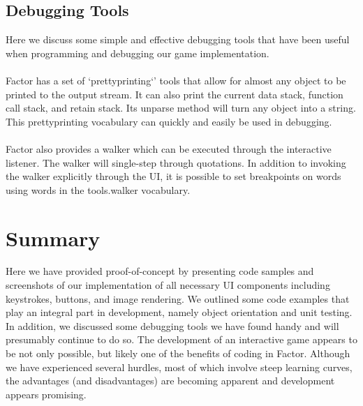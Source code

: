 \documentclass{sig-alternate}
\begin{document}
\subsection{Debugging Tools}
Here we discuss some simple and effective debugging tools that have been useful when programming and debugging our game implementation.
\\\\
Factor has a set of `prettyprinting`' tools that allow for almost any object to be printed to the output stream\cite{prettyprint}. It can also print the current data stack, function call stack, and retain stack. Its unparse method will turn any object into a string. This prettyprinting vocabulary can quickly and easily be used in debugging.
\\\\
Factor also provides a walker which can be executed through the interactive listener.  The walker will single-step through quotations.  In addition to invoking the walker explicitly through the UI, it is possible to set breakpoints on words using words in the tools.walker vocabulary.\cite{setbreakpoints}

\section{Summary}
Here we have provided proof-of-concept by presenting code samples and screenshots of our implementation of all necessary UI components including keystrokes, buttons, and image rendering. We outlined some code examples that play an integral part in development, namely object orientation and unit testing. In addition, we discussed some debugging tools we have found handy and will presumably continue to do so. The development of an interactive game appears to be not only possible, but likely one of the benefits of coding in Factor. Although we have experienced several hurdles, most of which involve steep learning curves, the advantages (and disadvantages) are becoming apparent and development appears promising.  

 
 

\balancecolumns
\end{document}
